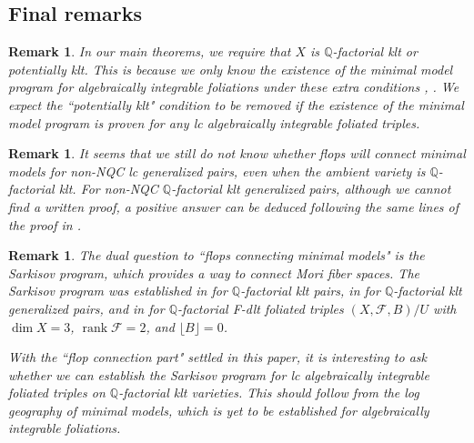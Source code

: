 \documentclass[preprint,12pt]{elsarticle}
\newcommand{\Qq}{\mathbb{Q}}
\newcommand{\rk}{\operatorname{rank}}
\newcommand{\Ff}{\mathcal{F}}
\newtheorem{rem}[thm]{Remark}
\begin{document}
\subsection{Final remarks}
\begin{rem} In our main theorems, we require that $X$ is $\Qq$-factorial klt or potentially klt. This is because we only know the existence of the minimal model program for algebraically integrable foliations under these extra conditions \cite[Theorems 1.2, 1.3]{LMX24b}, \cite[Theorem 1.11]{CHLMSSX24}. We expect the ``potentially klt" condition to be removed if the existence of the minimal model program is proven for any lc algebraically integrable foliated triples. \end{rem}

\begin{rem} It seems that we still do not know whether flops will connect minimal models for non-NQC lc generalized pairs, even when the ambient variety is $\Qq$-factorial klt. For non-NQC $\Qq$-factorial klt generalized pairs, although we cannot find a written proof, a positive answer can be deduced following the same lines of the proof in \cite[Proof of Theorem 1]{Kaw08}. \end{rem}

\begin{rem} The dual question to ``flops connecting minimal models" is the Sarkisov program, which provides a way to connect Mori fiber spaces. The Sarkisov program was established in \cite[Theorem 1.3]{HM13} for $\Qq$-factorial klt pairs, in \cite[Theorem 1.5]{Liu21} for $\Qq$-factorial klt generalized pairs, and in \cite[Theorem 1.1]{Mas24} for $\Qq$-factorial F-dlt foliated triples $(X,\Ff,B)/U$ with $\dim X=3$, $\rk\Ff=2$, and $\lfloor B\rfloor=0$.

With the ``flop connection part" settled in this paper, it is interesting to ask whether we can establish the Sarkisov program for lc algebraically integrable foliated triples on $\Qq$-factorial klt varieties. This should follow from the log geography of minimal models, which is yet to be established for algebraically integrable foliations. \end{rem}
% 



\end{document}
